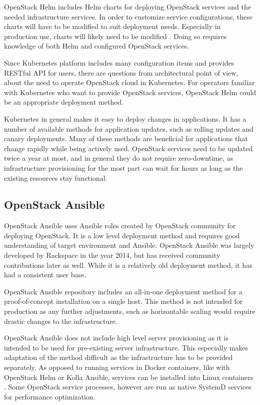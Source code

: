 OpenStack Helm includes Helm charts for deploying OpenStack services and the
needed infrastructure services. In order to customize service configurations,
these charts will have to be modified to suit deployment needs. Especially in
production use, charts will likely need to be modified \cite{openstack-helm}.
Doing so requires knowledge of both Helm and configured OpenStack services.

Since Kubernetes platform includes many configuration items and provides
RESTful API for users, there are questions from architectural point of view,
about the need to operate OpenStack cloud in Kubernetes. For operators familiar
with Kubernetes who want to provide OpenStack services, OpenStack Helm could be
an appropriate deployment method.

Kubernetes in general makes it easy to deploy changes in applications. It has a
number of available methods for application updates, such as rolling updates
and canary deployments. Many of these methods are beneficial for applications
that change rapidly while being actively used. OpenStack services need to be
updated twice a year at most, and in general they do not require zero-downtime,
as infrastructure provisioning for the most part can wait for hours as long as
the existing resources stay functional.

\subsection{OpenStack Ansible}

OpenStack Ansible \cite{openstack-ansible} uses Ansible roles created by
OpenStack community for deploying OpenStack. It is a low level deployment
method and requires good understanding of target environment and Ansible.
OpenStack Ansible was largely developed by Rackspace in the year 2014, but has
received community contributions later as well. While it is a relatively old
deployment method, it has had a consistent user base.

OpenStack Ansible repository includes an all-in-one deployment method for a
proof-of-concept installation on a single host. This method is not intended for
production as any further adjustments, such as horizontable scaling would
require drastic changes to the infrastructure.

OpenStack Ansible does not include high level server provisioning as it is
intended to be used for pre-existing server infrastructure. This especially
makes adaptation of the method difficult as the infrastructure has to be
provided separately. As opposed to running services in Docker containers, like
with OpenStack Helm or Kolla Ansible, services can be installed into Linux
containers \cite{linuxcontainers}. Some OpenStack service processes, however
are run as native SystemD services for performance optimization.

